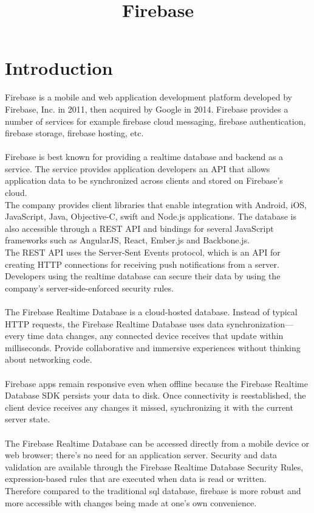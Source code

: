 \pagestyle{empty}


\date{}
\title{\Large\bf Firebase}

\maketitle

\section*{Introduction}
Firebase is a mobile and web application development platform developed by Firebase, Inc. in 2011, then acquired by Google in 2014.
Firebase provides a number of services for example firebase cloud messaging, firebase authentication, firebase storage, firebase hosting, etc.\\
\\ Firebase is best known for providing a realtime database and backend as a service. The service provides application developers an API that allows application data to be synchronized across clients and stored on Firebase's cloud.~\cite{Farr}\\ The company provides client libraries that enable integration with Android, iOS, JavaScript, Java, Objective-C, swift and Node.js applications. The database is also accessible through a REST API and bindings for several JavaScript frameworks such as AngularJS, React, Ember.js and Backbone.js.~\cite{FireReal} \\The REST API uses the Server-Sent Events protocol, which is an API for creating HTTP connections for receiving push notifications from a server. Developers using the realtime database can secure their data by using the company's server-side-enforced security rules.~\cite{Darrow}\\
\\The Firebase Realtime Database is a cloud-hosted database. Instead of typical HTTP requests, the Firebase Realtime Database uses data synchronization—every time data changes, any connected device receives that update within milliseconds. Provide collaborative and immersive experiences without thinking about networking code.\\
\\Firebase apps remain responsive even when offline because the Firebase Realtime Database SDK persists your data to disk. Once connectivity is reestablished, the client device receives any changes it missed, synchronizing it with the current server state. \\
\\The Firebase Realtime Database can be accessed directly from a mobile device or web browser; there’s no need for an application server. Security and data validation are available through the Firebase Realtime Database Security Rules, expression-based rules that are executed when data is read or written.\\Therefore compared to the traditional sql database, firebase is more robust and more accessible with changes being made at one's own convenience.


